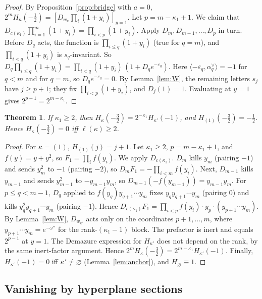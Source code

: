 \documentclass[11pt]{amsart}
\newtheorem{theorem}{Theorem}[section]
\theoremstyle{definition}
\theoremstyle{remark}
\begin{document}
\begin{proof}
By Proposition~\ref{prop:bridge} with $a=0$, $2^mH_\kappa(-\tfrac12)=[D_{w_\kappa}\prod_i(1+y_i)]_{y=1}$.
Let $p=m-\kappa_1+1$. We claim that $D_{c(\kappa_1)}\prod_{i=1}^m(1+y_i)=\prod_{i<p}(1+y_i)$.
Apply $D_m,D_{m-1},\dots,D_p$ in turn. Before $D_q$ acts, the function is
$\prod_{i\le q}(1+y_i)$ (true for $q=m$), and $\prod_{i<q}(1+y_i)$ is $s_q$-invariant. So
$D_q\prod_{i\le q}(1+y_i)=\prod_{i<q}(1+y_i)\,(1+D_qe^{-\varepsilon_q})$. Here
$\langle-\varepsilon_q,\alpha_q^\vee\rangle=-1$ for $q<m$ and for $q=m$, so
$D_qe^{-\varepsilon_q}=0$. By Lemma~\ref{lem:W}, the remaining letters $s_j$ have $j\ge p+1$; they
fix $\prod_{i<p}(1+y_i)$, and $D_j(1)=1$. Evaluating at $y=1$ gives $2^{p-1}=2^{m-\kappa_1}$.
\end{proof}

\begin{theorem}\label{thm:C}
If $\kappa_1\ge2$, then $H_\kappa(-\tfrac32)=2^{-\kappa_1}H_{\kappa'}(-1)$, and
$H_{(1)}(-\tfrac32)=-\tfrac12$. Hence $H_\kappa(-\tfrac32)=0$ iff $\ell(\kappa)\ge2$.
\end{theorem}

\begin{proof}
For $\kappa=(1)$, $H_{(1)}(j)=j+1$. Let $\kappa_1\ge2$, $p=m-\kappa_1+1$, and $f(y)=y+y^2$, so
$F_1=\prod_if(y_i)$. We apply $D_{c(\kappa_1)}$.
$D_m$ kills $y_m$ (pairing $-1$) and sends $y_m^2$ to $-1$ (pairing $-2$), so
$D_mF_1=-\prod_{i<m}f(y_i)$. Next, $D_{m-1}$ kills $y_{m-1}$ and sends $y_{m-1}^2$ to
$-y_{m-1}y_m$, so $D_{m-1}(-f(y_{m-1}))=y_{m-1}y_m$. For $p\le q<m-1$, $D_q$ applied to
$f(y_q)y_{q+1}\cdots y_m$ fixes $y_qy_{q+1}\cdots y_m$ (pairing $0$) and kills
$y_q^2y_{q+1}\cdots y_m$ (pairing $-1$). Hence
$D_{c(\kappa_1)}F_1=\prod_{i<p}f(y_i)\cdot y_p\cdot(y_{p+1}\cdots y_m)$. By
Lemma~\ref{lem:W}, $D_{w_{\kappa'}}$ acts only on the coordinates $p+1,\dots,m$, where
$y_{p+1}\cdots y_m=e^{-\omega''}$ for the rank-$(\kappa_1-1)$ block. The prefactor is inert and
equals $2^{p-1}$ at $y=1$. The Demazure expression for $H_{\kappa'}$ does not depend on the rank,
by the same inert-factor argument. Hence
$2^mH_\kappa(-\tfrac32)=2^{m-\kappa_1}H_{\kappa'}(-1)$. Finally, $H_{\kappa'}(-1)=0$ iff
$\kappa'\ne\varnothing$ (Lemma~\ref{lem:anchor}), and $H_\varnothing\equiv1$.
\end{proof}

\subsection{Vanishing by hyperplane sections}
\end{document}
